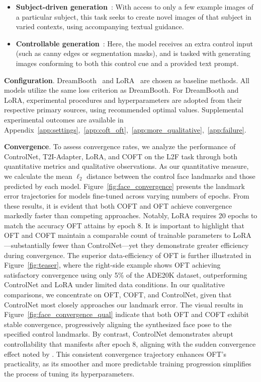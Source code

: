 \begin{itemize}[leftmargin=*,nosep]
    \item \textbf{Subject-driven generation}~\cite{ruiz2023dreambooth}: With access to only a few example images of a particular subject, this task seeks to create novel images of that subject in varied contexts, using accompanying textual guidance.
    \item \textbf{Controllable generation}~\cite{zhang2023adding,mou2023t2i}: Here, the model receives an extra control input (such as canny edges or segmentation masks), and is tasked with generating images conforming to both this control cue and a provided text prompt.
\end{itemize}

\textbf{Configuration}. DreamBooth~\cite{ruiz2023dreambooth} and LoRA~\cite{hulora2022} are chosen as baseline methods. All models utilize the same loss criterion as DreamBooth. For DreamBooth and LoRA, experimental procedures and hyperparameters are adopted from their respective primary sources, using recommended optimal values. Supplemental experimental outcomes are available in Appendix~\ref{app:settings},~\ref{app:coft_oft},~\ref{app:more_qualitative},~\ref{app:failure}.

\textbf{Convergence}. To assess convergence rates, we analyze the performance of ControlNet, T2I-Adapter, LoRA, and COFT on the L2F task through both quantitative metrics and qualitative observations. As our quantitative measure, we calculate the mean $\ell_2$ distance between the control face landmarks and those predicted by each model. Figure~\ref{fig:face_convergence} presents the landmark error trajectories for models fine-tuned across varying numbers of epochs. From these results, it is evident that both COFT and OFT achieve convergence markedly faster than competing approaches. Notably, LoRA requires 20 epochs to match the accuracy OFT attains by epoch 8. It is important to highlight that OFT and COFT maintain a comparable count of trainable parameters to LoRA—substantially fewer than ControlNet—yet they demonstrate greater efficiency during convergence. The superior data-efficiency of OFT is further illustrated in Figure~\ref{fig:teaser}, where the right-side example shows OFT achieving satisfactory convergence using only 5\% of the ADE20K dataset, outperforming ControlNet and LoRA under limited data conditions. In our qualitative comparisons, we concentrate on OFT, COFT, and ControlNet, given that ControlNet most closely approaches our landmark error. The visual results in Figure~\ref{fig:face_convergence_qual} indicate that both OFT and COFT exhibit stable convergence, progressively aligning the synthesized face pose to the specified control landmarks. By contrast, ControlNet demonstrates abrupt controllability that manifests after epoch 8, aligning with the sudden convergence effect noted by \cite{zhang2023adding}. This consistent convergence trajectory enhances OFT’s practicality, as its smoother and more predictable training progression simplifies the process of tuning its hyperparameters.

